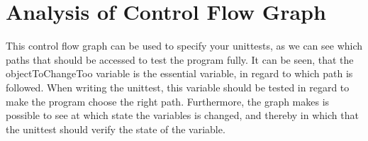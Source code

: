 \section{Analysis of Control Flow Graph}
This control flow graph can be used to specify your unittests, as we can see which paths that should be accessed to test the program fully. It can be seen, that the objectToChangeToo variable is the essential variable, in regard to which path is followed. When writing the unittest, this variable should be tested in regard to make the program choose the right path.
Furthermore, the graph makes is possible to see at which state the variables is changed, and thereby in which that the unittest should verify the state of the variable.